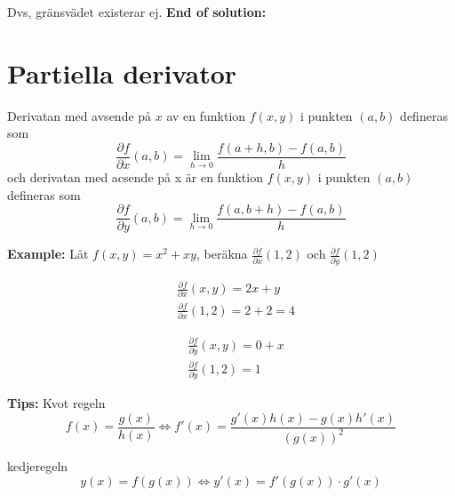 Dvs, gränsvädet existerar ej.
\textbf{End of solution:}


%

\section{Partiella derivator}
Derivatan med avsende på $x$ av en funktion $f(x,y)$ i punkten $(a,b)$ defineras som
\begin{equation*}
    \frac{\partial f}{\partial x} (a,b) = \lim_{h\to0}\frac{f(a+h, b) - f(a,b)}{h}
\end{equation*}
och derivatan med acsende på x är en funktion $f(x,y)$ i punkten $(a,b)$ defineras som
\begin{equation*}
    \frac{\partial f}{\partial y} (a,b) = \lim_{h\to0}\frac{f(a, b+h) - f(a,b)}{h}
\end{equation*}

\textbf{Example:}
Låt $f(x,y) = x^2 + xy$, beräkna $\frac{\partial f}{\partial x}(1,2)$ och $\frac{\partial f}{\partial y}(1,2)$

\begin{align*}
    &\frac{\partial f}{\partial x}(x,y) = 2x + y \\
    &\frac{\partial f}{\partial x}(1,2) = 2 + 2 = 4
\end{align*}

\begin{align*}
    &\frac{\partial f}{\partial y}(x,y) = 0 + x \\
    &\frac{\partial f}{\partial y}(1,2) = 1
\end{align*}

\textbf{Tips:}\newline
Kvot regeln
\begin{equation*}
    f(x) = \frac{g(x)}{h(x)} \Leftrightarrow
    f'(x) = \frac{g'(x)h(x)-g(x)h'(x)}{(g(x))^2}
\end{equation*}

kedjeregeln
\begin{equation*}
    y(x) = f(g(x)) \Leftrightarrow
    y'(x) = f'(g(x))\cdot g'(x)
\end{equation*}



